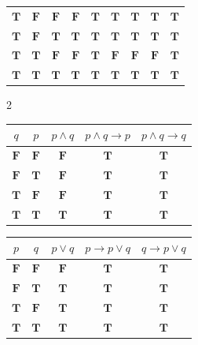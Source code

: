 \documentclass[12pt]{article}
\begin{document}
{\begin{longtable}[]{@{}ccccccccc@{}}
\(\textbf{T}\) & \(\textbf{F}\) & \(\textbf{F}\) & \(\textbf{F}\) & \(\textbf{T}\) & \(\textbf{T}\) & \(\textbf{T}\) & \(\textbf{T}\) & \(\textbf{T}\) \tabularnewline
\(\textbf{T}\) & \(\textbf{F}\) & \(\textbf{T}\) & \(\textbf{T}\) & \(\textbf{T}\) & \(\textbf{T}\) & \(\textbf{T}\) & \(\textbf{T}\) & \(\textbf{T}\) \tabularnewline
\(\textbf{T}\) & \(\textbf{T}\) & \(\textbf{F}\) & \(\textbf{F}\) & \(\textbf{T}\) & \(\textbf{F}\) & \(\textbf{F}\) & \(\textbf{F}\) & \(\textbf{T}\) \tabularnewline
\(\textbf{T}\) & \(\textbf{T}\) & \(\textbf{T}\) & \(\textbf{T}\) & \(\textbf{T}\) & \(\textbf{T}\) & \(\textbf{T}\) & \(\textbf{T}\) & \(\textbf{T}\) \tabularnewline
\bottomrule
\end{longtable}


\begin{multicols}{2}
    \setbox\ltmcbox\vbox\bgroup
    \makeatletter\col@number\@ne
\begin{longtable}[]{@{}ccccc@{}}
\toprule
\(q\) & \(p\) & \(p \land q\) & \(p \land q \to p\) & \(p \land q \to q\)\tabularnewline
\midrule
\endhead
\(\textbf{F}\) & \(\textbf{F}\) & \(\textbf{F}\) &
\(\textbf{T}\) & \(\textbf{T}\)\tabularnewline
\(\textbf{F}\) & \(\textbf{T}\) & \(\textbf{F}\) &
\(\textbf{T}\) & \(\textbf{T}\)\tabularnewline
\(\textbf{T}\) & \(\textbf{F}\) & \(\textbf{F}\) &
\(\textbf{T}\) & \(\textbf{T}\)\tabularnewline
\(\textbf{T}\) & \(\textbf{T}\) & \(\textbf{T}\) &
\(\textbf{T}\) & \(\textbf{T}\)\tabularnewline
\bottomrule
\end{longtable}
\unskip
\unpenalty
\unpenalty\egroup
\unvbox\ltmcbox
\setbox\ltmcbox\vbox\bgroup
\makeatletter\col@number\@ne
\begin{longtable}[]{@{}ccccc@{}}
\toprule
\(p\) & \(q\) & \(p \lor q\) & \(p \to p \lor q\) & \(q \to p \lor q\)\tabularnewline
\midrule
\endhead
\(\textbf{F}\) & \(\textbf{F}\) & \(\textbf{F}\) &
\(\textbf{T}\) & \(\textbf{T}\)\tabularnewline
\(\textbf{F}\) & \(\textbf{T}\) & \(\textbf{T}\) &
\(\textbf{T}\) & \(\textbf{T}\)\tabularnewline
\(\textbf{T}\) & \(\textbf{F}\) & \(\textbf{T}\) &
\(\textbf{T}\) & \(\textbf{T}\)\tabularnewline
\(\textbf{T}\) & \(\textbf{T}\) & \(\textbf{T}\) &
\(\textbf{T}\) & \(\textbf{T}\)\tabularnewline
\bottomrule
\end{longtable}
\unskip
\unpenalty
\unpenalty\egroup
\unvbox\ltmcbox
\end{multicols}

}
\end{document}
